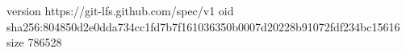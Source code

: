 version https://git-lfs.github.com/spec/v1
oid sha256:804850d2e0dda734cc1fd7b7f161036350b0007d20228b91072fdf234bc15616
size 786528
